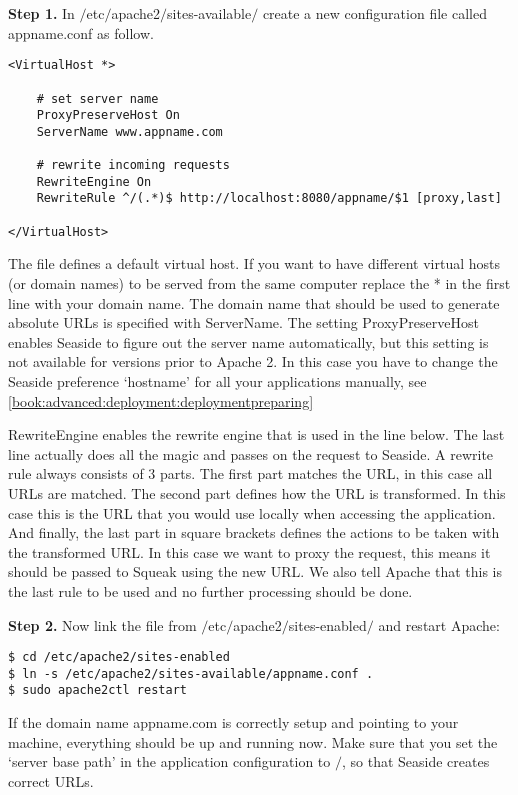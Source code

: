 \documentclass[a4paper,10pt,twoside]{book}
\newcommand{\ct}[1]{{\small\ttfamily\textup{#1}}}
\begin{document}
\textbf{Step 1.} In \ct{$/$etc$/$apache2$/$sites-available$/$} create a new configuration file called \ct{appname.conf} as follow. 

\begin{lstlisting}
<VirtualHost *>

    # set server name
    ProxyPreserveHost On
    ServerName www.appname.com

    # rewrite incoming requests
    RewriteEngine On
    RewriteRule ^/(.*)$ http://localhost:8080/appname/$1 [proxy,last]

</VirtualHost>
\end{lstlisting}

The file defines a default virtual host. If you want to have different virtual hosts (or domain names) to be served from the same computer replace the \ct{*} in the first line with your domain name. The domain name that should be used to generate absolute URLs is specified with \ct{ServerName}. The setting \ct{ProxyPreserveHost} enables Seaside to figure out the server name automatically, but this setting is not available for versions prior to Apache 2. In this case you have to change the Seaside preference `hostname' for all your applications manually, see \autoref{book:advanced:deployment:deploymentpreparing}

 \ct{RewriteEngine} enables the rewrite engine that is used in the line below. The last line actually does all the magic and passes on the request to Seaside. A rewrite rule always consists of 3 parts. The first part matches the URL, in this case all URLs are matched. The second part defines how the URL is transformed. In this case this is the URL that you would use locally when accessing the application. And finally, the last part in square brackets defines the actions to be taken with the transformed URL. In this case we want to proxy the request, this means it should be passed to Squeak using the new URL. We also tell Apache that this is the last rule to be used and no further processing should be done.

\textbf{Step 2.} Now link the file from \ct{$/$etc$/$apache2$/$sites-enabled$/$} and restart Apache:

\begin{lstlisting}
$ cd /etc/apache2/sites-enabled
$ ln -s /etc/apache2/sites-available/appname.conf .
$ sudo apache2ctl restart
\end{lstlisting}

If the domain name \ct{appname.com} is correctly setup and pointing to your machine, everything should be up and running now. Make sure that you set the `server base path' in the application configuration to \ct{$/$}, so that Seaside creates correct URLs.
\end{document}
